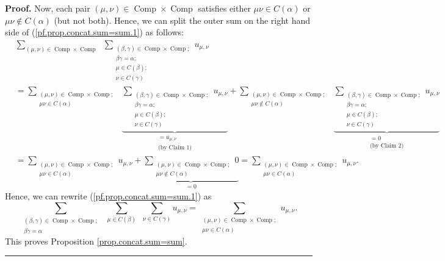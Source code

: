 \documentclass[numbers=enddot,12pt,final,onecolumn,notitlepage]{scrartcl}%
\theoremstyle{definition}
\newenvironment{proof}[1][Proof]{\noindent\textbf{#1.} }{\ \rule{0.5em}{0.5em}}
\let\sumnonlimits\sum
\renewcommand{\sum}{\sumnonlimits\limits}
\begin{document}
\begin{proof}
Now, each pair $\left(  \mu,\nu\right)  \in\operatorname*{Comp}\times
\operatorname*{Comp}$ satisfies either $\mu\nu\in C\left(  \alpha\right)  $ or
$\mu\nu\notin C\left(  \alpha\right)  $ (but not both). Hence, we can split
the outer sum on the right hand side of (\ref{pf.prop.concat.sum=sum.1}) as
follows:%
\begin{align*}
&  \sum_{\left(  \mu,\nu\right)  \in\operatorname*{Comp}\times
\operatorname*{Comp}}\ \ \sum_{\substack{\left(  \beta,\gamma\right)
\in\operatorname*{Comp}\times\operatorname*{Comp};\\\beta\gamma=\alpha
;\\\mu\in C\left(  \beta\right)  ;\\\nu\in C\left(  \gamma\right)  }%
}u_{\mu,\nu}\\
&  =\sum_{\substack{\left(  \mu,\nu\right)  \in\operatorname*{Comp}%
\times\operatorname*{Comp};\\\mu\nu\in C\left(  \alpha\right)  }%
}\ \ \underbrace{\sum_{\substack{\left(  \beta,\gamma\right)  \in
\operatorname*{Comp}\times\operatorname*{Comp};\\\beta\gamma=\alpha;\\\mu\in
C\left(  \beta\right)  ;\\\nu\in C\left(  \gamma\right)  }}u_{\mu,\nu}%
}_{\substack{=u_{\mu,\nu}\\\text{(by Claim 1)}}}+\sum_{\substack{\left(
\mu,\nu\right)  \in\operatorname*{Comp}\times\operatorname*{Comp};\\\mu
\nu\notin C\left(  \alpha\right)  }}\ \ \underbrace{\sum_{\substack{\left(
\beta,\gamma\right)  \in\operatorname*{Comp}\times\operatorname*{Comp}%
;\\\beta\gamma=\alpha;\\\mu\in C\left(  \beta\right)  ;\\\nu\in C\left(
\gamma\right)  }}u_{\mu,\nu}}_{\substack{=0\\\text{(by Claim 2)}}}\\
&  =\sum_{\substack{\left(  \mu,\nu\right)  \in\operatorname*{Comp}%
\times\operatorname*{Comp};\\\mu\nu\in C\left(  \alpha\right)  }}u_{\mu,\nu
}+\underbrace{\sum_{\substack{\left(  \mu,\nu\right)  \in\operatorname*{Comp}%
\times\operatorname*{Comp};\\\mu\nu\notin C\left(  \alpha\right)  }}0}%
_{=0}=\sum_{\substack{\left(  \mu,\nu\right)  \in\operatorname*{Comp}%
\times\operatorname*{Comp};\\\mu\nu\in C\left(  \alpha\right)  }}u_{\mu,\nu}.
\end{align*}
Hence, we can rewrite (\ref{pf.prop.concat.sum=sum.1}) as%
\[
\sum_{\substack{\left(  \beta,\gamma\right)  \in\operatorname*{Comp}%
\times\operatorname*{Comp};\\\beta\gamma=\alpha}}\ \ \sum_{\mu\in C\left(
\beta\right)  }\ \ \sum_{\nu\in C\left(  \gamma\right)  }u_{\mu,\nu}%
=\sum_{\substack{\left(  \mu,\nu\right)  \in\operatorname*{Comp}%
\times\operatorname*{Comp};\\\mu\nu\in C\left(  \alpha\right)  }}u_{\mu,\nu}.
\]
This proves Proposition \ref{prop.concat.sum=sum}.
\end{proof}
\end{document}

